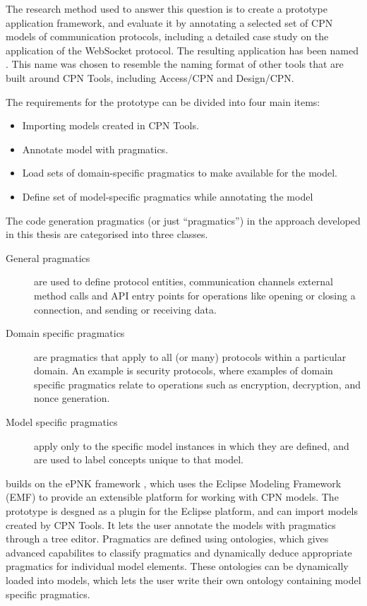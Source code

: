 The research method used to answer this question is to create a prototype
application framework, and evaluate it by annotating a selected set of CPN
models of communication protocols, including a detailed case study on the
application of the WebSocket protocol. The resulting application has been named
\thename{}. This name was chosen to resemble the naming format of other tools that
are built around CPN Tools, including Access/CPN and Design/CPN.

The requirements for the prototype can be divided into four main items:

\begin{itemize} 
	\item Importing models created in CPN Tools. 

	\item Annotate model with pragmatics. 
		
	\item Load sets of domain-specific pragmatics to make available for the model.
	
	\item Define set of model-specific pragmatics while annotating the model

\end{itemize}

The code generation pragmatics (or just ``pragmatics'') in the approach
developed in this thesis are categorised into three classes.
\begin{description}
	\item[General pragmatics] are used to define protocol entities, communication
	channels external method calls and API entry points for operations like opening
	or closing a connection, and sending or receiving data.
	\item[Domain specific pragmatics] are pragmatics that apply to all (or many)
	protocols within a particular domain. An example is security protocols, where
	examples of domain specific pragmatics relate to operations such as
	encryption, decryption, and nonce generation.
	\item[Model specific pragmatics] apply only to the specific model instances in
	which they are defined, and are used to label concepts unique to that model. 
\end{description}

\thename{} builds on the ePNK framework \cite{kindler2011epnk}, which uses the
Eclipse Modeling Framework (EMF) to provide an extensible platform for working with CPN models. The
prototype is desgned as a plugin for the Eclipse platform, and can import models
created by CPN Tools. It lets the user annotate the models with pragmatics through a tree
editor. Pragmatics are defined using ontologies, which gives advanced
capabilites to classify pragmatics and dynamically deduce appropriate
pragmatics for individual model elements. These ontologies can be dynamically
loaded into models, which lets the user write their own ontology containing
model specific pragmatics.

